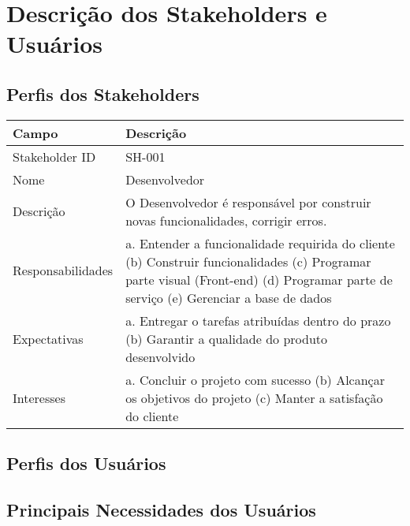 \chapter{Descrição dos Stakeholders e Usuários}

\section{Perfis dos Stakeholders}

\begin{table}[]
\begin{tabular}{ll}
\hline
Campo                                   & Descrição                                                                                                                                                                                                \\ \hline
\multicolumn{1}{|l|}{Stakeholder ID}    & \multicolumn{1}{l|}{SH-001}                                                                                                                                                                              \\ \hline
\multicolumn{1}{|l|}{Nome}              & \multicolumn{1}{l|}{Desenvolvedor}                                                                                                                                                                       \\ \hline
\multicolumn{1}{|l|}{Descrição}         & \multicolumn{1}{l|}{O Desenvolvedor é responsável por construir novas funcionalidades, corrigir erros.}                                                                                                  \\ \hline
\multicolumn{1}{|l|}{Responsabilidades} & \multicolumn{1}{l|}{a. Entender a funcionalidade requirida do cliente (b) Construir funcionalidades (c) Programar parte visual (Front-end) (d) Programar parte de serviço (e) Gerenciar a base de dados} \\ \hline
\multicolumn{1}{|l|}{Expectativas}      & \multicolumn{1}{l|}{a. Entregar o tarefas atribuídas dentro do prazo (b) Garantir a qualidade do produto desenvolvido}                                                                                   \\ \hline
Interesses                              & a. Concluir o projeto com sucesso (b) Alcançar os objetivos do projeto (c) Manter a satisfação do cliente                                                                                                \\ \hline
\end{tabular}
\end{table}

\section{Perfis dos Usuários}
\section{Principais Necessidades dos Usuários}
